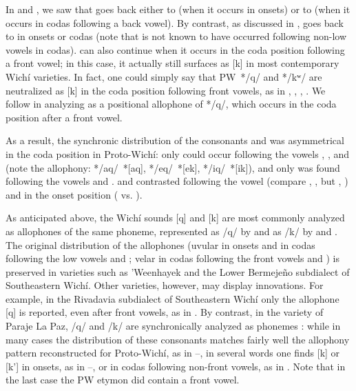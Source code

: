 In  and , we saw that  goes back either to  (when it occurs in onsets) or to  (when it occurs in codas following a back vowel). By contrast, as discussed in ,  goes back to  in onsets or codas (note that  is not known to have occurred following non-low vowels in codas).  can also continue  when it occurs in the coda position following a front vowel; in this case, it actually still surfaces as [k] in most contemporary Wichí varieties. In fact, one could simply say that PW~*/q/ and */kʷ/ are neutralized as [k] in the coda position following front vowels, as in , , , . We follow \citet[49--50]{VN14} in analyzing  as a positional allophone of */q/, which occurs in the coda position after a front vowel. 

As a result, the synchronic distribution of the consonants  and  was asymmetrical in the coda position in Proto-Wichí: only  could occur following the vowels , , and  (note the allophony: */aq/~*[aq], */eq/~*[ek], */iq/~*[ik]), and only  was found following the vowels  and .  and  contrasted following the vowel  (compare , , but , ) and in the onset position ( vs. ).

As anticipated above, the Wichí sounds [q] and [k] are most commonly analyzed as allophones of the same phoneme, represented as /q/ by \citet[49--50]{VN14} and as /k/ by \citet[43]{MA08} and \citet[136]{MC09}. The original distribution of the allophones (uvular in onsets and in codas following the low vowels  and ; velar in codas following the front vowels  and ) is preserved in varieties such as 'Weenhayek and the Lower Bermejeño subdialect of Southeastern Wichí. Other varieties, however, may display innovations. For example, in the Rivadavia subdialect of Southeastern Wichí only the allophone [q] is reported, even after front vowels, as in  \citep[48]{JT09-cap}. By contrast, in the variety of Paraje La Paz, /q/ and /k/ are synchronically analyzed as phonemes \citep{AFG067}: while in many cases the distribution of these consonants matches fairly well the allophony pattern reconstructed for Proto-Wichí, as in --, in several words one finds [k] or [k’] in onsets, as in --, or in codas following non-front vowels, as in . Note that in the last case the PW etymon did contain a front vowel.

